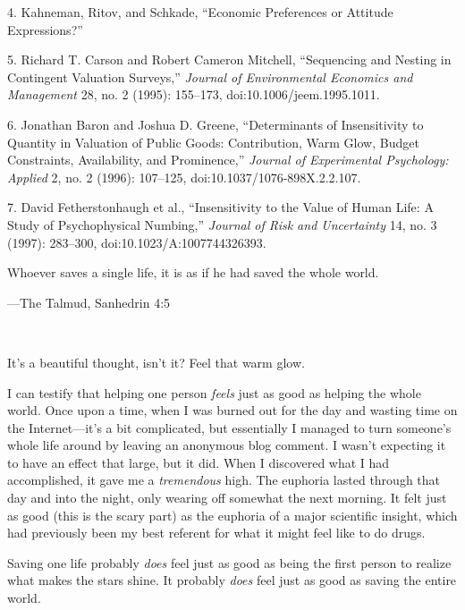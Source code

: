 {
 4. Kahneman, Ritov, and Schkade, ``Economic
Preferences or Attitude Expressions?''}

{
 5. Richard T. Carson and Robert Cameron Mitchell,
``Sequencing and Nesting in Contingent Valuation
Surveys,'' \textit{Journal of Environmental Economics
and Management} 28, no. 2 (1995): 155--173,
doi:10.1006/jeem.1995.1011.}

{
 6. Jonathan Baron and Joshua D. Greene,
``Determinants of Insensitivity to Quantity in
Valuation of Public Goods: Contribution, Warm Glow, Budget Constraints,
Availability, and Prominence,'' \textit{Journal of
Experimental Psychology: Applied} 2, no. 2 (1996): 107--125,
doi:10.1037/1076-898X.2.2.107.}

{
 7. David Fetherstonhaugh et al., ``Insensitivity
to the Value of Human Life: A Study of Psychophysical
Numbing,'' \textit{Journal of Risk and Uncertainty}
14, no. 3 (1997): 283--300, doi:10.1023/A:1007744326393.}


{
 Whoever saves a single life, it is as if he had saved the whole
world.}

{\raggedleft
 {}---The Talmud, Sanhedrin 4:5
\par}


\bigskip

{
 ~}

{
 It's a beautiful thought, isn't
it? Feel that warm glow.}

{
 I can testify that helping one person \textit{feels} just as good
as helping the whole world. Once upon a time, when I was burned out for
the day and wasting time on the Internet---it's a bit
complicated, but essentially I managed to turn
someone's whole life around by leaving an anonymous
blog comment. I wasn't expecting it to have an effect
that large, but it did. When I discovered what I had accomplished, it
gave me a \textit{tremendous} high. The euphoria lasted through that
day and into the night, only wearing off somewhat the next morning. It
felt just as good (this is the scary part) as the euphoria of a major
scientific insight, which had previously been my best referent for what
it might feel like to do drugs.}

{
 Saving one life probably \textit{does} feel just as good as being
the first person to realize what makes the stars shine. It probably
\textit{does} feel just as good as saving the entire world.}

